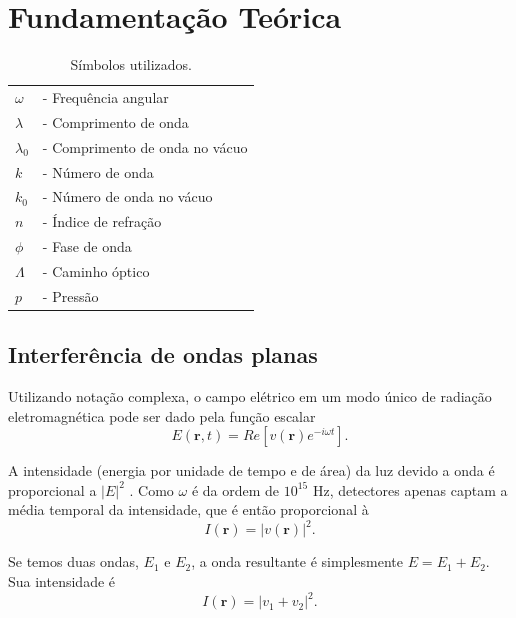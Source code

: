 \section{Fundamentação Teórica}

\begin{table}[b]
\centering
\caption{Símbolos utilizados.}
\begin{tabular}{ll}
\toprule\midrule
 $\omega$ & - Frequência angular \\
 $\lambda$ & - Comprimento de onda \\
 $\lambda_0$ & - Comprimento de onda no vácuo \\
 $k$ & - Número de onda \\
 $k_0$ & - Número de onda no vácuo \\
 $n$ &  - Índice de refração \\
 $\phi$& - Fase de onda \\
 $\Lambda$ & - Caminho óptico \\
 $p$ & - Pressão \\
\midrule\bottomrule
\end{tabular}
\end{table}

\subsection*{Interferência de ondas planas}
Utilizando notação complexa, o campo elétrico em um modo único de radiação eletromagnética pode ser dado pela função escalar
\begin{equation}
E(\mathbf{r}, t) = Re \left[ v(\mathbf{r}) e^{-i\omega t} \right].
\end{equation}

\noindent A intensidade (energia por unidade de tempo e de área) da luz devido a onda é proporcional a $|E|^2$ . Como $\omega$ é da ordem de $10^{15} $ Hz, detectores apenas captam a média temporal da intensidade, que é então proporcional à
\begin{equation}
I(\mathbf{r}) = |v(\mathbf{r})|^2.
\end{equation}

Se temos duas ondas, $E_1$ e $E_2$, a onda resultante é simplesmente $E = E_1 + E_2$. Sua intensidade é
\begin{equation}\label{eq: intensity2}
I(\mathbf{r}) = |v_1 + v_2|^2.
\end{equation}
 
